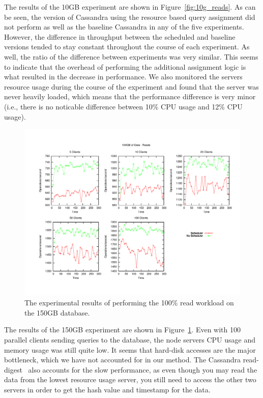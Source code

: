 \documentclass[]{acm_proc_article-sp}
\begin{document}
The results of the 10GB experiment are shown in Figure~\ref{fig:10g_reads}. As can be seen, the version of Cassandra using the resource based query assignment did not perform as well as the baseline Cassandra in any of the five experiments. However, the difference in throughput between the scheduled and baseline versions tended to stay constant throughout the course of each experiment. As well, the ratio of the difference between experiments was very similar. This seems to indicate that the overhead of performing the additional assignment logic is what resulted in the decrease in performance. We also monitored the servers resource usage during the course of the experiment and found that the server was never heavily loaded, which means that the performance difference is very minor (i.e., there is no noticable difference between 10\% CPU usage and 12\% CPU usage).

\begin{figure}[t]
\centering
\includegraphics[scale=0.63]{images/150GB_Reads.pdf}
\vspace{-15pt}
\caption{The experimental results of performing the 100\% read workload on the 150GB database.}
\label{fig:150g_reads}
\end{figure}

The results of the 150GB experiment are shown in Figure~\ref{fig:150g_reads}. Even with 100 parallel clients sending queries to the database, the node servers CPU usage and memory usage was still quite low. It seems that hard-disk accesses are the major bottleneck, which we have not accounted for in our method. The Cassandra read-digest~\cite{http://wiki.apache.org/cassandra/DigestQueries} also accounts for the slow performance, as even though you may read the data from the lowest resource usage server, you still need to access the other two servers in order to get the hash value and timestamp for the data.
\end{document}
